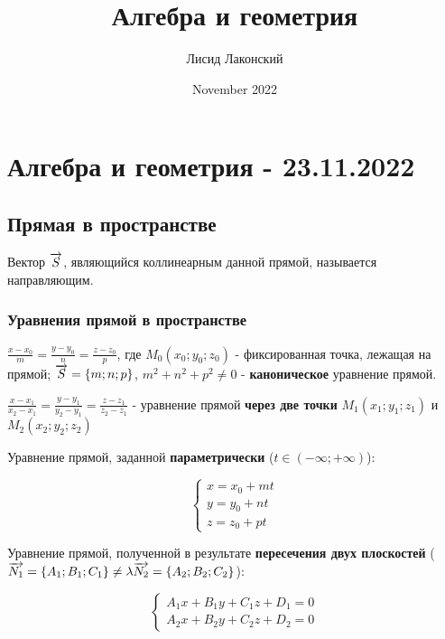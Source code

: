 \documentclass{article}
\title{Алгебра и геометрия}
\author{Лисид Лаконский}
\date{November 2022}
\def\vec{\ensuremath\overrightarrow}
\begin{document}
\maketitle

\tableofcontents
\pagebreak

\section{Алгебра и геометрия - 23.11.2022}

\subsection{Прямая в пространстве}

\begin{flushleft}

Вектор $\vec{S}$, являющийся коллинеарным данной прямой, называется направляющим.

\subsubsection{Уравнения прямой в пространстве}

$\frac{x - x_0}{m} = \frac{y - y_0}{n} = \frac{z - z_0}{p}$, где $M_0(x_0; y_0; z_0)$ - фиксированная точка, лежащая на прямой; $\vec{S} = \{ m; n; p \}$, $m^2 + n^2 + p^2 \ne 0$ - \textbf{каноническое} уравнение прямой.

$\frac{x - x_1}{x_2 - x_1} = \frac{y - y_1}{y_2 - y_1} = \frac{z - z_1}{z_2 - z_1}$ - уравнение прямой \textbf{через две точки} $M_1(x_1; y_1; z_1)$ и $M_2(x_2; y_2; z_2)$

Уравнение прямой, заданной \textbf{параметрически} ($t \in (- \infty; +\infty) $):

\begin{equation}
    \begin{cases}
        x = x_0 + mt \\
        y = y_0 + n t \\
        z = z_0 + pt
    \end{cases}
\end{equation}

Уравнение прямой, полученной в результате \textbf{пересечения двух плоскостей} ($\vec{N_1} = \{ A_1; B_1; C_1 \} \ne \lambda \vec{N_2} = \{ A_2; B_2; C_2 \}$):

\begin{equation}
    \begin{cases}
        A_1 x + B_1 y + C_1 z + D_1 = 0 \\
        A_2 x + B_2 y + C_2 z + D_2 = 0
    \end{cases}
\end{equation}


\end{flushleft}
\end{document}
